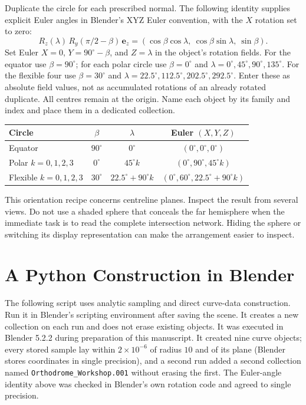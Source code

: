 Duplicate the circle for each prescribed normal. The following identity supplies explicit Euler angles in Blender's XYZ Euler convention, with the $X$ rotation set to zero:
\[
  R_z(\lambda)\,R_y(\pi/2-\beta)\,\mathbf e_z
  =(\cos\beta\cos\lambda,\ \cos\beta\sin\lambda,\ \sin\beta).
\]
Set Euler $X=0$, $Y=90^\circ-\beta$, and $Z=\lambda$ in the object's rotation fields. For the equator use $\beta=90^\circ$; for each polar circle use $\beta=0^\circ$ and $\lambda=0^\circ,45^\circ,90^\circ,135^\circ$. For the flexible four use $\beta=30^\circ$ and $\lambda=22.5^\circ,112.5^\circ,202.5^\circ,292.5^\circ$. Enter these as absolute field values, not as accumulated rotations of an already rotated duplicate. All centres remain at the origin. Name each object by its family and index and place them in a dedicated collection.

\begin{checkpoint}
\centering
\begin{tabular}{@{}lccc@{}}
\toprule
Circle & $\beta$ & $\lambda$ & Euler $(X,Y,Z)$\\
\midrule
Equator & $90^\circ$ & $0^\circ$ & $(0^\circ,0^\circ,0^\circ)$\\
Polar $k=0,1,2,3$ & $0^\circ$ & $45^\circ k$ & $(0^\circ,90^\circ,45^\circ k)$\\
Flexible $k=0,1,2,3$ & $30^\circ$ & $22.5^\circ+90^\circ k$ & $(0^\circ,60^\circ,22.5^\circ+90^\circ k)$\\
\bottomrule
\end{tabular}
\end{checkpoint}

This orientation recipe concerns centreline planes. Inspect the result from several views. Do not use a shaded sphere that conceals the far hemisphere when the immediate task is to read the complete intersection network. Hiding the sphere or switching its display representation can make the arrangement easier to inspect.

\section{A Python Construction in Blender}

The following script uses analytic sampling and direct curve-data construction. Run it in Blender's scripting environment after saving the scene. It creates a new collection on each run and does not erase existing objects. It was executed in Blender 5.2.2 during preparation of this manuscript. It created nine curve objects; every stored sample lay within $2\times10^{-6}$ of radius $10$ and of its plane (Blender stores coordinates in single precision), and a second run added a second collection named \texttt{Orthodrome\_Workshop.001} without erasing the first. The Euler-angle identity above was checked in Blender's own rotation code and agreed to single precision.

